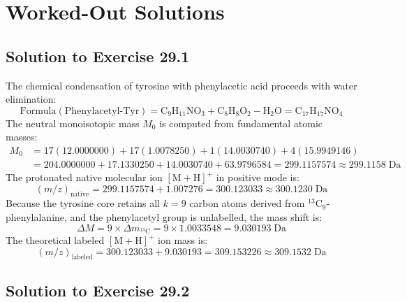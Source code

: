 \documentclass[11pt,twoside,openright]{book}
\begin{document}
\section{Worked-Out Solutions}

\subsection{Solution to Exercise 29.1}

The chemical condensation of tyrosine with phenylacetic acid proceeds with water elimination:
\begin{equation}
\text{Formula}(\text{Phenylacetyl-Tyr}) = \text{C}_9\text{H}_{11}\text{NO}_3 + \text{C}_8\text{H}_8\text{O}_2 - \text{H}_2\text{O} = \text{C}_{17}\text{H}_{17}\text{NO}_4
\end{equation}
The neutral monoisotopic mass $M_0$ is computed from fundamental atomic masses:
\begin{align}
M_0 &= 17(12.0000000) + 17(1.0078250) + 1(14.0030740) + 4(15.9949146) \nonumber \\
    &= 204.0000000 + 17.1330250 + 14.0030740 + 63.9796584 = 299.1157574 \approx 299.1158\;\text{Da}
\end{align}
The protonated native molecular ion $[\text{M}+\text{H}]^+$ in positive mode is:
\begin{equation}
(m/z)_{\text{native}} = 299.1157574 + 1.007276 = 300.123033 \approx 300.1230\;\text{Da}
\end{equation}
Because the tyrosine core retains all $k = 9$ carbon atoms derived from $^{13}\text{C}_9$-phenylalanine, and the phenylacetyl group is unlabelled, the mass shift is:
\begin{equation}
\Delta M = 9 \times \Delta m_{^{13}\text{C}} = 9 \times 1.0033548 = 9.030193\;\text{Da}
\end{equation}
The theoretical labeled $[\text{M}+\text{H}]^+$ ion mass is:
\begin{equation}
(m/z)_{\text{labeled}} = 300.123033 + 9.030193 = 309.153226 \approx 309.1532\;\text{Da}
\end{equation}

\subsection{Solution to Exercise 29.2}
\end{document}
